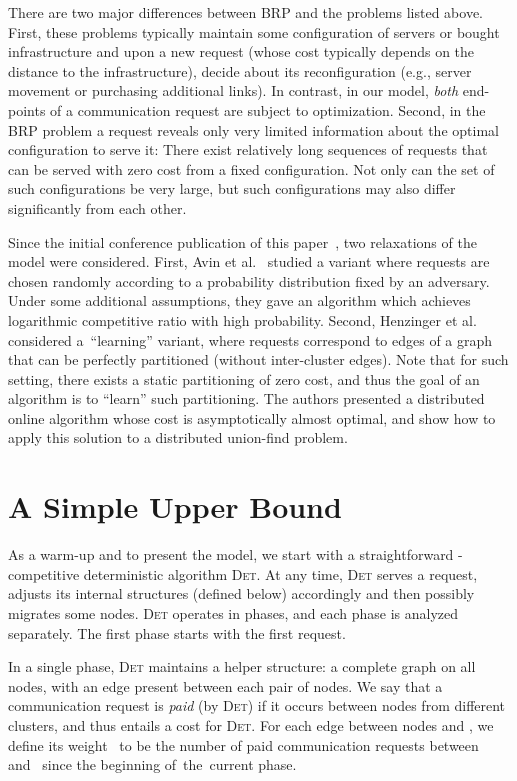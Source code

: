\documentclass{siamart190516}
\newcommand{\DET}{\textsc{Det}\xspace}
\begin{document}
There are two major differences between BRP and the problems listed above.
First, these problems typically maintain some configuration of servers or
bought infrastructure and upon a new request (whose cost typically depends on
the distance to the infrastructure), decide about its reconfiguration (e.g.,
server movement or purchasing additional links). In contrast, in our model,
\emph{both} end-points of a communication request are subject to optimization.
Second, in the BRP problem a request reveals only very limited information
about the optimal configuration to serve it: There exist relatively long
sequences of requests that can be served with zero cost from a fixed
configuration. Not only can the set of such configurations be very large, but
such configurations may also differ significantly from each other.

Since the initial conference publication of this paper~\cite{disc16}, two
relaxations of the model were considered. First, Avin et al.~\cite{computing18}
studied a variant where requests are chosen randomly according to a probability
distribution fixed by an adversary. Under some additional assumptions, they gave
an algorithm which achieves logarithmic competitive ratio with high probability.
Second, Henzinger et al.~\cite{sigmetrics19learn} considered a~``learning''
variant, where requests correspond to edges of a graph that can be perfectly
partitioned (without inter-cluster edges). Note that for such setting, there
exists a static partitioning of zero cost, and thus the goal of an algorithm is
to ``learn'' such partitioning. The authors presented a distributed online
algorithm whose cost is asymptotically almost optimal, and show how to apply
this solution to a distributed union-find problem. 




\section{A Simple Upper Bound}
\label{sec:upper}

As a warm-up and to present the model, we start with a straightforward -competitive deterministic algorithm \DET. At any time, \DET
serves a request, adjusts its internal structures (defined below)
accordingly and then possibly migrates some nodes. \DET operates in phases, and each
phase is analyzed separately. The first phase starts with the first request.

In a single phase, \DET maintains a helper structure: a complete graph on all
 nodes, with an edge present between each pair of nodes. We say
that a communication request is \emph{paid} (by \DET) if it occurs between
nodes from different clusters, and thus entails a cost for \DET. For each edge
between nodes  and , we define its weight~ to be the number of
paid communication requests between  and~ since the beginning of~the~current phase.
\end{document}
